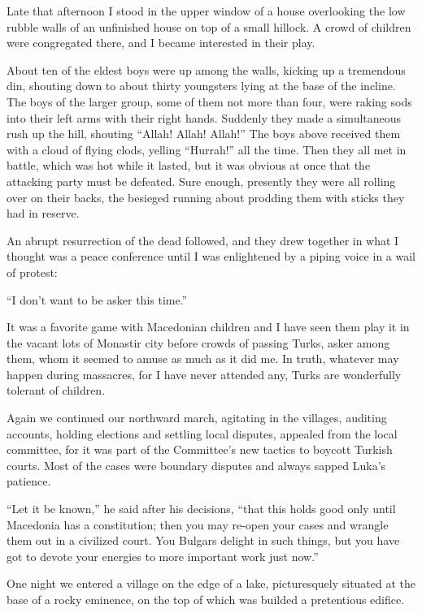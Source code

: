 \documentclass[a5paper,12pt]{book}
\begin{document}
Late that afternoon I stood in the upper window of a house overlooking the low rubble walls of an unfinished house on top of a small hillock. A crowd of children were congregated there, and I became interested in their play. 

About ten of the eldest boys were up among the walls, kicking up a tremendous din, shouting down to about thirty youngsters lying at the base of the incline. The boys of the larger group, some of them not more than four, were raking sods into their left arms with their right hands. Suddenly they made a simultaneous rush up the hill, shouting “Allah! Allah! Allah!” The boys above received them with a cloud of flying clods, yelling “Hurrah!” all the time. Then they all met in battle, which was hot while it lasted, but it was obvious at once that the attacking party must be defeated. Sure enough, presently they were all rolling over on their backs, the besieged running about prodding them with sticks they had in reserve. 

An abrupt resurrection of the dead followed, and they drew together in what I thought was a peace conference until I was enlightened by a piping voice in a wail of protest: 

“I don’t want to be asker this time.” 

It was a favorite game with Macedonian children and I have seen them play it in the vacant lots of Monastir city before crowds of passing Turks, asker among them, whom it seemed to amuse as much as it did me. In truth, whatever may happen during massacres, for I have never attended any, Turks are wonderfully tolerant of children. 

Again we continued our northward march, agitating in the villages, auditing accounts, holding elections and settling local disputes, appealed from the local committee, for it was part of the Committee’s new tactics to boycott Turkish courts. Most of the cases were boundary disputes and always sapped Luka’s patience. 

“Let it be known,” he said after his decisions, “that this holds good only until Macedonia has a constitution; then you may re-open your cases and wrangle them out in a civilized court. You Bulgars delight in such things, but you have got to devote your energies to more important work just now.” 

One night we entered a village on the edge of a lake, picturesquely situated at the base of a rocky eminence, on the top of which was builded a pretentious edifice. 
\end{document}

